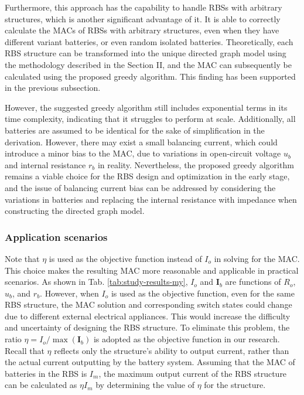 \documentclass{article}
\begin{document}
Furthermore, this approach has the capability to handle RBSs with arbitrary structures, which is another significant advantage of it. 
It is able to correctly calculate the MACs of RBSs with arbitrary structures, even when they have different variant batteries, or even random isolated batteries. 
Theoretically, each RBS structure can be transformed into the unique directed graph model using the methodology described in the Section II, and the MAC can subsequently be calculated using the proposed greedy algorithm.
This finding has been supported in the previous subsection. 


However, the suggested greedy algorithm still includes exponential terms in its time complexity, indicating that it struggles to perform at scale. 
Additionally, all batteries are assumed to be identical for the sake of simplification in the derivation.
However, there may exist a small balancing current, which could introduce a minor bias to the MAC, due to variations in open-circuit voltage $u_b$ and internal resistance $r_b$ in reality.
Nevertheless, the proposed greedy algorithm remains a viable choice for the RBS design and optimization in the early stage, and the issue of balancing current bias can be addressed by considering the variations in batteries and replacing the internal resistance with impedance when constructing the directed graph model.

\subsubsection{Application scenarios}

Note that $\eta$ is used as the objective function instead of $I_o$ in solving for the MAC. 
This choice makes the resulting MAC more reasonable and applicable in practical scenarios. 
As shown in Tab. \ref{tab:study-results-my}, $I_o$ and $\bm{I}_b$ are functions of $R_o$, $u_b$, and $r_b$. 
However, when $I_o$ is used as the objective function, even for the same RBS structure, the MAC solution and corresponding switch states could change due to different external electrical appliances.
This would increase the difficulty and uncertainty of designing the RBS structure. 
To eliminate this problem, the ratio $\eta=I_o/\max(\bm{I}_b)$ is adopted as the objective function in our research.
Recall that $\eta$ reflects only the structure's ability to output current, rather than the actual current outputting by the battery system.
Assuming that the MAC of batteries in the RBS is $I_m$, the maximum output current of the RBS structure can be calculated as $\eta I_m$ by determining the value of $\eta$ for the structure. 
\end{document}
